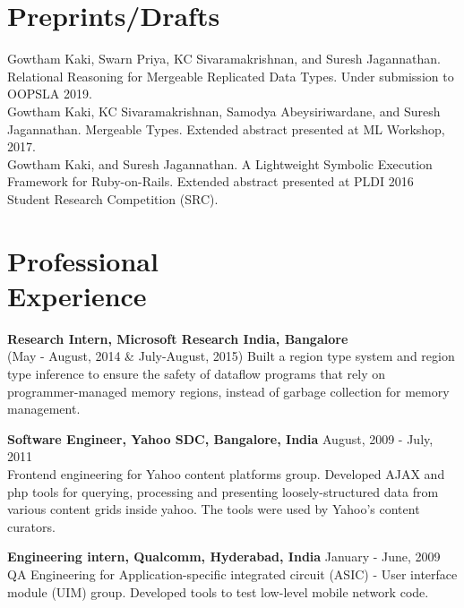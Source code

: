 \documentclass[margin,line]{res}
\begin{document}
\begin{resume}
\section{Preprints/Drafts}
Gowtham Kaki, Swarn Priya, KC Sivaramakrishnan, and Suresh
  Jagannathan. Relational Reasoning for Mergeable Replicated Data
  Types. Under submission to OOPSLA 2019.
\vspace*{0.1in}\\
Gowtham Kaki, KC Sivaramakrishnan, Samodya Abeysiriwardane, and Suresh
  Jagannathan. Mergeable Types. Extended abstract presented at ML
  Workshop, 2017.
\vspace*{0.1in}\\
Gowtham Kaki, and Suresh Jagannathan. A Lightweight Symbolic Execution
Framework for Ruby-on-Rails. Extended abstract presented at PLDI 2016
Student Research Competition (SRC).
 
\section{Professional \\ Experience}

{\bf Research Intern, Microsoft Research India, Bangalore} \\
(May - August, 2014 \& July-August, 2015) 
Built a region type system and region type inference to ensure the
safety of dataflow programs that rely on programmer-managed memory
regions, instead of garbage collection for memory management.

{\bf Software Engineer, Yahoo SDC, Bangalore, India} \hfill August, 2009 -
July, 2011\\
Frontend engineering for Yahoo content platforms group. Developed AJAX
and php tools for querying, processing and presenting
loosely-structured data from various content grids inside yahoo. The
tools were used by Yahoo's content curators.

{\bf Engineering intern, Qualcomm, Hyderabad, India} \hfill January - June, 2009\\
QA Engineering for Application-specific integrated circuit (ASIC) -
User interface module (UIM) group. Developed tools to test low-level
mobile network code.


\end{resume}
\end{document}
